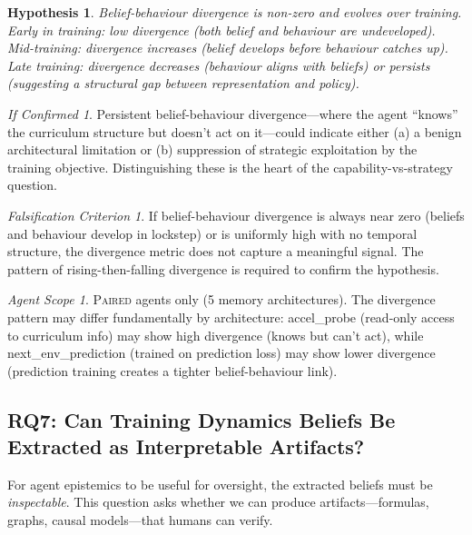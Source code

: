 \documentclass[11pt,a4paper]{article}
\newtheorem{hypothesis}{Hypothesis}[subsection]
\theoremstyle{remark}
\newtheorem*{falsification}{Falsification Criterion}
\newtheorem*{implication}{If Confirmed}
\newtheorem*{agentscope}{Agent Scope}
\newcommand{\paired}{\textsc{Paired}}
\begin{document}
\begin{hypothesis}
Belief-behaviour divergence is non-zero and evolves over training. Early in training: low divergence (both belief and behaviour are undeveloped). Mid-training: divergence increases (belief develops before behaviour catches up). Late training: divergence decreases (behaviour aligns with beliefs) \textit{or} persists (suggesting a structural gap between representation and policy).
\end{hypothesis}

\begin{implication}
Persistent belief-behaviour divergence---where the agent ``knows'' the curriculum structure but doesn't act on it---could indicate either (a) a benign architectural limitation or (b) suppression of strategic exploitation by the training objective. Distinguishing these is the heart of the capability-vs-strategy question.
\end{implication}

\begin{falsification}
If belief-behaviour divergence is always near zero (beliefs and behaviour develop in lockstep) or is uniformly high with no temporal structure, the divergence metric does not capture a meaningful signal. The pattern of rising-then-falling divergence is required to confirm the hypothesis.
\end{falsification}

\begin{agentscope}
\paired{} agents only (5 memory architectures). The divergence pattern may differ fundamentally by architecture: accel\_probe (read-only access to curriculum info) may show high divergence (knows but can't act), while next\_env\_prediction (trained on prediction loss) may show lower divergence (prediction training creates a tighter belief-behaviour link).
\end{agentscope}

\subsection{RQ7: Can Training Dynamics Beliefs Be Extracted as Interpretable Artifacts?}
\label{sec:rq7}

For agent epistemics to be useful for oversight, the extracted beliefs must be \textit{inspectable}. This question asks whether we can produce artifacts---formulas, graphs, causal models---that humans can verify.
\end{document}
